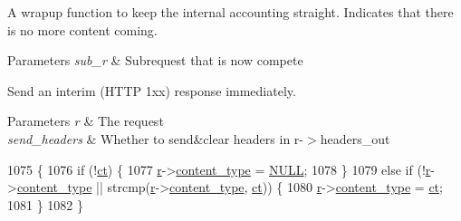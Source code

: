 A wrapup function to keep the internal accounting straight. Indicates that there is no more content coming. 
\begin{DoxyParams}{Parameters}
{\em sub\+\_\+r} & Subrequest that is now compete\\
\hline
\end{DoxyParams}
Send an interim (H\+T\+TP 1xx) response immediately. 
\begin{DoxyParams}{Parameters}
{\em r} & The request \\
\hline
{\em send\+\_\+headers} & Whether to send\&clear headers in r-\/$>$headers\+\_\+out \\
\hline
\end{DoxyParams}

\begin{DoxyCode}
1075 \{
1076     \textcolor{keywordflow}{if} (!\hyperlink{group__APACHE__CORE__PROTO_ga7e93f988a62cb0584f3f8eeebdd32e4b}{ct}) \{
1077         \hyperlink{group__APACHE__CORE__CONFIG_ga091cdd45984e865a888a4f8bb8fe107a}{r}->\hyperlink{structrequest__rec_a539f8aba497328ed3e9c4628b0b7b4b0}{content\_type} = \hyperlink{pcre_8txt_ad7f989d16aa8ca809a36bc392c07fba1}{NULL};
1078     \}
1079     \textcolor{keywordflow}{else} \textcolor{keywordflow}{if} (!\hyperlink{group__APACHE__CORE__CONFIG_ga091cdd45984e865a888a4f8bb8fe107a}{r}->\hyperlink{structrequest__rec_a539f8aba497328ed3e9c4628b0b7b4b0}{content\_type} || strcmp(\hyperlink{group__APACHE__CORE__CONFIG_ga091cdd45984e865a888a4f8bb8fe107a}{r}->\hyperlink{structrequest__rec_a539f8aba497328ed3e9c4628b0b7b4b0}{content\_type}, 
      \hyperlink{group__APACHE__CORE__PROTO_ga7e93f988a62cb0584f3f8eeebdd32e4b}{ct})) \{
1080         \hyperlink{group__APACHE__CORE__CONFIG_ga091cdd45984e865a888a4f8bb8fe107a}{r}->\hyperlink{structrequest__rec_a539f8aba497328ed3e9c4628b0b7b4b0}{content\_type} = \hyperlink{group__APACHE__CORE__PROTO_ga7e93f988a62cb0584f3f8eeebdd32e4b}{ct};
1081     \}
1082 \}
\end{DoxyCode}
